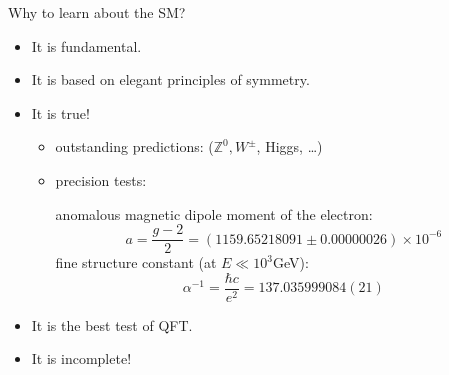 Why to learn about the SM?
\begin{itemize}
  \item It is fundamental.
  \item It is based on elegant principles of symmetry.
  \item It is true!
    \begin{itemize}
      \item outstanding predictions: ($\mathbb{Z}^0, W^{\pm}$, Higgs, \dots)
      \item precision tests: \par
	anomalous magnetic dipole moment of the electron: \begin{equation}a = \frac{g - 2}{2} = (1159.65218091 \pm 0.00000026) \times 10^{-6}\end{equation} 
	fine structure constant (at $E \ll 10^3$GeV):
	\begin{equation}
	  \alpha^{-1} = \frac{\hbar c}{e^2} = 137.035999084(21)
	\end{equation}
    \end{itemize}
  \item It is the best test of QFT.
  \item It is incomplete!
\end{itemize}
